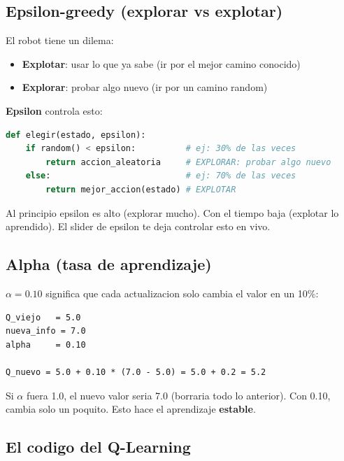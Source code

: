 \documentclass[11pt,a4paper]{article}
\begin{document}
\subsection{Epsilon-greedy (explorar vs explotar)}

El robot tiene un dilema:

\begin{itemize}
    \item \textbf{Explotar}: usar lo que ya sabe (ir por el mejor camino conocido)
    \item \textbf{Explorar}: probar algo nuevo (ir por un camino random)
\end{itemize}

\textbf{Epsilon} controla esto:

\begin{lstlisting}[language=Python]
def elegir(estado, epsilon):
    if random() < epsilon:          # ej: 30% de las veces
        return accion_aleatoria     # EXPLORAR: probar algo nuevo
    else:                           # ej: 70% de las veces
        return mejor_accion(estado) # EXPLOTAR
\end{lstlisting}

\begin{importante}
Al principio epsilon es alto (explorar mucho). Con el tiempo baja (explotar lo aprendido). El slider de epsilon te deja controlar esto en vivo.
\end{importante}

\subsection{Alpha (tasa de aprendizaje)}

$\alpha = 0.10$ significa que cada actualizacion solo cambia el valor en un 10\%:

\begin{lstlisting}
Q_viejo   = 5.0
nueva_info = 7.0
alpha     = 0.10

Q_nuevo = 5.0 + 0.10 * (7.0 - 5.0) = 5.0 + 0.2 = 5.2
\end{lstlisting}

Si $\alpha$ fuera 1.0, el nuevo valor seria 7.0 (borraria todo lo anterior). Con 0.10, cambia solo un poquito. Esto hace el aprendizaje \textbf{estable}.

\newpage
\subsection{El codigo del Q-Learning}
\end{document}
